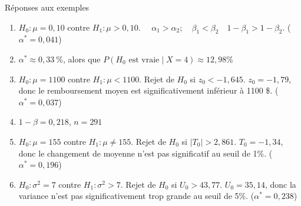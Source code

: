 \documentclass{BeamerTemplate}
\begin{document}
\begin{frame}[t]{Réponses aux exemples}

{\scriptsize

\begin{enumerate}
  \item $H_0:\mu=0,10$ contre $H_1: \mu>0,10$. $\quad\alpha_1>\alpha_2; \quad\beta_1<\beta_2 \quad1-\beta_1>1-\beta_2$. ($\alpha^*=0,041$)
  \item $\alpha^*\approx 0,33~\%$, alors que $P(H_0\text{\ est vraie}\;|\;X=4)\approx12,98\%$
  \item $H_0:\mu=1100$ contre $H_1: \mu<1100$. Rejet de $H_0$ si $z_0<-1,645$. $z_0=-1,79$, donc le remboursement moyen est significativement inférieur à 1100 \$. ($\alpha^*=0,037$)
  \item $1-\beta = 0,218$, $n=291$
  \item $H_0:\mu=155$ contre $H_1: \mu\ne 155$. Rejet de $H_0$ si $|T_0|>2,861$. $T_0=-1,34$, donc le changement de moyenne n'est pas significatif au seuil de 1\%. ($\alpha^*=0,196$)
  \item  $H_0:\sigma^2=7$ contre $H_1: \sigma^2>7$. Rejet de $H_0$ si $U_0>43,77$. $U_0=35,14$, donc la variance n'est pas significativement trop grande au seuil de 5\%. ($\alpha^*=0,238$)
 \end{enumerate}
 }
\end{frame}
\end{document}
